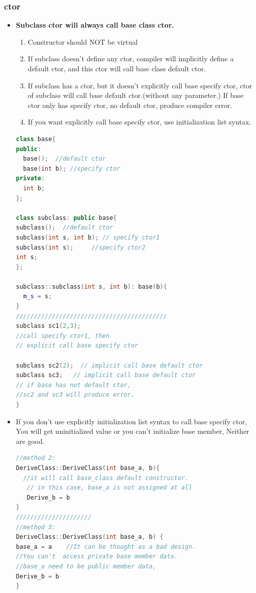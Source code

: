 \documentclass[a4paper,12pt,twoside]{book}
\begin{document}
\subsubsection{ctor}
\begin{itemize}

\item  \textbf{Subclass ctor will always call base class ctor.}

\begin{enumerate}
\item Constructor should NOT be virtual
\item If subclass doesn't define any ctor, compiler will implicitly define a default ctor, and this ctor will call base class default ctor.
\item If subclass has a ctor, but it doesn't explicitly call base specify ctor, ctor of subclass will call base default ctor.(without any parameter.) If base ctor only has specify ctor, no default ctor, produce compiler error.
\item If you want explicitly call base specify ctor, use initialization list syntax.

\end{enumerate}

\begin{lstlisting}[frame=single, language=c++]
class base{
public:
  base();  //default ctor
  base(int b); //specify ctor
private:
  int b;
};

class subclass: public base{
subclass();  //default ctor
subclass(int s, int b); // specify ctor1
subclass(int s);     //specify ctor2
int s;
};

subclass::subclass(int s, int b): base(b){
  m_s = s;
}
//////////////////////////////////////////
subclass sc1(2,3);
//call specify ctor1, then
// explicit call base specify ctor

subclass sc2(2);  // implicit call base default ctor
subclass sc3;   // implicit call base default ctor
// if base has not default ctor,
//sc2 and sc3 will produce error.
}
\end{lstlisting}
\item If you don't use  explicitly initialization list syntax to call base specify ctor, You will get uninitialized value or you can't initialize base member, Neither are good.
\begin{lstlisting}[frame=single, language=c++]
//method 2:
DeriveClass::DeriveClass(int base_a, b){
  //it will call base_class default constructor.
   // in this case, base_a is not assigned at all
   Derive_b = b
}	
/////////////////////
//method 3:
DeriveClass::DeriveClass(int base_a, b) {
base_a = a    //It can be thought as a bad design.
//You can't  access private base member data.
//base_a need to be public member data,
Derive_b = b
}
\end{lstlisting}


\end{itemize}
\end{document}
